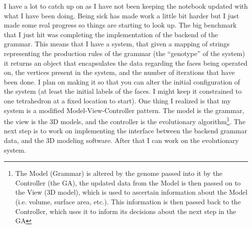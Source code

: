 \documentclass[letterpaper,oneside,titlepage]{article}
\begin{document}
I have a lot to catch up on as I have not been keeping the notebook updated with what I have been doing.  Being sick has made work a little bit harder but I just made some real progress so things are starting to look up.  The big benchmark that I just hit was completing the implementation of the backend of the grammar.  This means that I have a system, that given a mapping of strings representing the production rules of the grammar (the ``genotype'' of the system) it returns an object that encapsulates the data regarding the faces being operated on, the vertices present in the system, and the number of iterations that have been done.  I plan on making it so that you can alter the initial configuration of the system (at least the initial labels of the faces.  I might keep it constrained to one tetrahedron at a fixed location to start).  One thing I realized is that my system is a modified Model-View-Controller pattern.  The model is the grammar, the view is the 3D models, and the controller is the evolutionary algorithm\footnote{The Model (Grammar) is altered by the genome passed into it by the Controller (the GA), the updated data from the Model is then passed on to the View (3D model), which is used to ascertain information about the Model (i.e. volume, surface area, etc.).  This information is then passed back to the Controller, which uses it to inform its decisions about the next step in the GA}.  The next step is to work on implementing the interface between the backend grammar data, and the 3D modeling software.  After that I can work on the evolutionary system.
\end{document}
